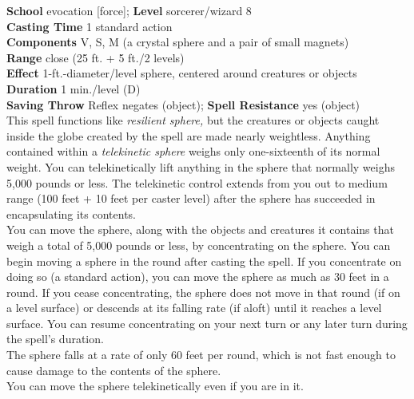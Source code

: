 \textbf{School} evocation [force]; \textbf{Level} sorcerer/wizard 8\\
\textbf{Casting Time} 1 standard action\\
\textbf{Components} V, S, M (a crystal sphere and a pair of small magnets)\\
\textbf{Range} close (25 ft. + 5 ft./2 levels)\\
\textbf{Effect} 1-ft.-diameter/level sphere, centered around creatures or objects\\
\textbf{Duration} 1 min./level (D)\\
\textbf{Saving Throw} Reflex negates (object); \textbf{Spell Resistance} yes (object)\\
This spell functions like \textit{resilient sphere, }but the creatures or objects caught inside the globe created by the spell are made nearly weightless. Anything contained within a \textit{telekinetic sphere }weighs only one-sixteenth of its normal weight. You can telekinetically lift anything in the sphere that normally weighs 5,000 pounds or less. The telekinetic control extends from you out to medium range (100 feet + 10 feet per caster level) after the sphere has succeeded in encapsulating its contents.\\
You can move the sphere, along with the objects and creatures it contains that weigh a total of 5,000 pounds or less, by concentrating on the sphere. You can begin moving a sphere in the round after casting the spell. If you concentrate on doing so (a standard action), you can move the sphere as much as 30 feet in a round. If you cease concentrating, the sphere does not move in that round (if on a level surface) or descends at its falling rate (if aloft) until it reaches a level surface. You can resume concentrating on your next turn or any later turn during the spell's duration.\\
The sphere falls at a rate of only 60 feet per round, which is not fast enough to cause damage to the contents of the sphere.\\
You can move the sphere telekinetically even if you are in it.\\
